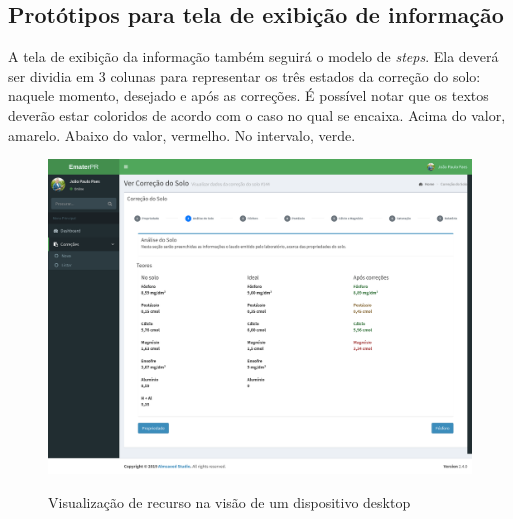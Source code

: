\subsection{Protótipos para tela de exibição de informação}
\label{sec:titSecPrototiposShow}

A tela de exibição da informação também seguirá o modelo de \textit{steps}. Ela deverá ser dividia em 3 colunas para representar os três estados da correção do solo: naquele momento, desejado e após as correções. É possível notar que os textos deverão estar coloridos de acordo com o caso no qual se encaixa. Acima do valor, amarelo. Abaixo do valor, vermelho. No intervalo, verde.

\begin{figure}[H]
    \centering
    \caption{Visualização de recurso na visão de um dispositivo desktop}
    \includegraphics[width=13cm]{./dados/figuras/prototipos/show_desktop.png}
    \label{fig:prototipo_show_desk}
\end{figure}

